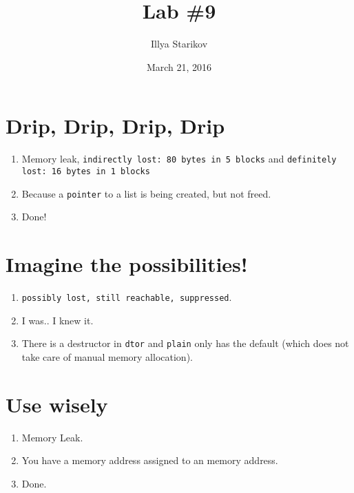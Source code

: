 \documentclass{article}
\title{Lab \#9}
\author{Illya Starikov}
\date{March 21, 2016}
\begin{document}
\maketitle

\section{Drip, Drip, Drip, Drip}
\begin{enumerate}
    \item Memory leak, \texttt{indirectly lost: 80 bytes in 5 blocks} and \texttt{definitely lost: 16 bytes in 1 blocks}
    \item Because a \texttt{pointer} to a list is being created, but not freed.
    \item Done!
\end{enumerate}

\section{Imagine the possibilities!}
\begin{enumerate}
    \item \texttt{possibly lost, still reachable, suppressed}.
    \item I was.. I knew it.
    \item There is a destructor in \texttt{dtor} and \texttt{plain} only has the default (which does not take care of manual memory allocation).
\end{enumerate}

\section{Use wisely}
\begin{enumerate}
    \item Memory Leak.
    \item You have a memory address assigned to an memory address.
    \item Done.
\end{enumerate}
\end{document}

